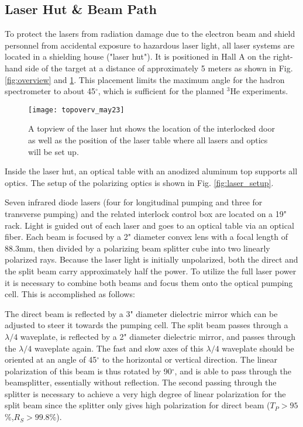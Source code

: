 {%
\subsection{Laser Hut \& Beam Path}
\label{sec:las}

To protect the lasers from radiation damage due to the electron beam
and shield personnel from accidental exposure to hazardous laser
light, all laser systems are located in a shielding house ("laser hut").
It is positioned in Hall A on the right-hand side of the target at a
distance of approximately 5 meters as shown in Fig.
\ref{fig:overview} and \ref{fig:laserhut}.  This placement limits
the maximum angle for the hadron spectrometer to about 45$^\circ$,
which is sufficient for the planned $^3$He experiments.

\begin{figure}
\begin{center}
\centerline{\texttt{[image: topoverv\_may23]}}
\caption[A topview of the laser hut]{ A topview of the laser hut shows the location
of the interlocked door as well as the position of the laser table where
all lasers and optics will be set up.}
\label{fig:laserhut}
\end{center}
\end{figure}
Inside the laser hut, an optical table with an anodized aluminum top
supports all optics. The setup of the
polarizing optics is shown in Fig. \ref{fig:laser_setup}. 

Seven infrared diode lasers (four for longitudinal pumping and three
for transverse pumping) and the related interlock control box
 are located on a 19" rack.  Light is guided out of each laser and 
goes to an optical table via an optical fiber.  Each beam is focused by a 2" 
diameter convex lens with a focal length of 88.3mm, then divided by a polarizing
beam splitter cube into two linearly polarized rays.  Because the
laser light is initially unpolarized, both the direct and the split
beam carry approximately half the power. To utilize the full laser
power it is necessary to combine both beams and focus them onto the
optical pumping cell.  This is accomplished as follows:

The direct beam is reflected by a 3" diameter dielectric mirror which
can be adjusted to steer it towards the pumping cell.  The split beam
passes through a $\lambda/4$ waveplate, is reflected by a 2" diameter
dielectric mirror, and passes through the $\lambda/4$ waveplate again.  The 
fast and slow axes of this $\lambda/4$ waveplate should be oriented at an 
angle of 45$^\circ$ to the horizontal or vertical direction.  The
linear polarization of this beam is thus rotated by 90$^\circ$, and is
able to pass through the beamsplitter, essentially without
reflection.  The second passing through the splitter is necessary to
achieve a very high degree of linear polarization for the split beam
since the splitter only gives high polarization for direct beam 
($T_P>95$\%,$R_S>99.8$\%).

}

